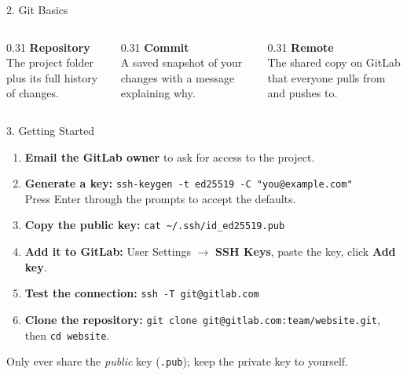 \documentclass[aspectratio=169,11pt]{beamer}
\begin{document}
\begin{frame}{2. Git Basics}
  \begin{columns}[T]
    \begin{column}{0.31\textwidth}
      \textbf{\color{accent}Repository}\\[0.4em]
      The project folder plus its full history of changes.
    \end{column}
    \begin{column}{0.31\textwidth}
      \textbf{\color{accent}Commit}\\[0.4em]
      A saved snapshot of your changes with a message explaining why.
    \end{column}
    \begin{column}{0.31\textwidth}
      \textbf{\color{accent}Remote}\\[0.4em]
      The shared copy on GitLab that everyone pulls from and pushes to.
    \end{column}
  \end{columns}
\end{frame}

\begin{frame}{3. Getting Started}
  \small
  \begin{enumerate}
    \setlength\itemsep{0.55em}
    \item \textbf{Email the GitLab owner} to ask for access to the project.
    \item \textbf{Generate a key:} \texttt{ssh-keygen -t ed25519 -C "you@example.com"}\\
          Press Enter through the prompts to accept the defaults.
    \item \textbf{Copy the public key:} \texttt{cat \textasciitilde/.ssh/id\_ed25519.pub}
    \item \textbf{Add it to GitLab:} User Settings $\to$ \textbf{SSH Keys}, paste the key, click \textbf{Add key}.
    \item \textbf{Test the connection:} \texttt{ssh -T git@gitlab.com}
    \item \textbf{Clone the repository:} \texttt{git clone git@gitlab.com:team/website.git}, then \texttt{cd website}.
  \end{enumerate}
  \vspace{0.4em}
  Only ever share the \emph{public} key (\texttt{.pub}); keep the private key to yourself.
\end{frame}
\end{document}
